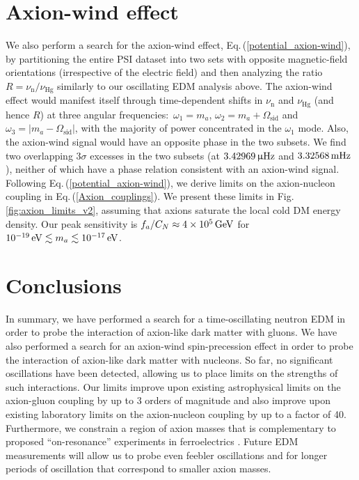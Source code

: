
\section{Axion-wind effect}
We also perform a search for the axion-wind effect, Eq.\,(\ref{potential_axion-wind}), by partitioning the entire PSI dataset into two sets with opposite magnetic-field orientations (irrespective of the electric field) and then analyzing the ratio $R = \nu_\mathrm{n} / \nu_\textrm{Hg}$ similarly to our oscillating EDM analysis above.
The axion-wind effect would manifest itself through time-dependent shifts in $\nu_\mathrm{n}$ and $\nu_\textrm{Hg}$ (and hence $R$) at three angular frequencies:~$\omega_1 = m_a$, $\omega_2 = m_a + \Omega_{\textrm{sid}}$ and $\omega_3 = |m_a - \Omega_{\textrm{sid}}|$, with the majority of power concentrated in the $\omega_1$ mode.
Also, the axion-wind signal would have an opposite phase in the two subsets.
We find two overlapping $3\sigma$ excesses in the two subsets (at $\unit[3.42969]{\upmu Hz}$ and $\unit[3.32568]{mHz}$), neither of which have a phase relation consistent with an axion-wind signal.
Following Eq.\,(\ref{potential_axion-wind}), we derive limits on the axion-nucleon coupling in Eq.\,(\ref{Axion_couplings}).
We present these limits in Fig.\,\ref{fig:axion_limits_v2}, assuming that axions saturate the local cold DM energy density.
Our peak sensitivity is
$f_a/C_N \approx \unit[4 \times 10^{5}]{GeV}$ for $\unit[10^{-19}]{eV} \lesssim m_a \lesssim \unit[10^{-17}]{eV}$.

\section{Conclusions}
In summary, we have performed a search for a time-oscillating neutron EDM in order to probe the interaction of axion-like dark matter with gluons.
We have also performed a search for an axion-wind spin-precession effect in order to probe the interaction of axion-like dark matter with nucleons.
So far, no significant oscillations have been detected, allowing us to place limits on the strengths of such interactions.
Our limits improve upon existing astrophysical limits on the axion-gluon coupling by up to 3 orders of magnitude and also improve upon existing laboratory limits on the axion-nucleon coupling by up to a factor of 40.
Furthermore, we constrain a region of axion masses that is complementary to proposed ``on-resonance'' experiments in ferroelectrics \cite{CASPEr2014}. Future EDM measurements will allow us to probe even feebler oscillations and for longer periods of oscillation that correspond to smaller axion masses.

